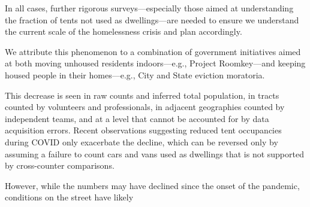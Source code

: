 \documentclass[11pt]{article}
\begin{document}
\indent In all cases, further rigorous surveys---especially those aimed at understanding the fraction of
tents not used as  dwellings---are needed to ensure we understand the current scale of the 
homelessness crisis and plan accordingly.

We attribute this phenomenon to a combination of government initiatives aimed at both moving unhoused
residents indoors---e.g., Project Roomkey---and keeping housed people in their homes---e.g., City and State
eviction moratoria. 


This decrease is seen in raw counts and inferred total
population, in tracts counted by volunteers and professionals, in adjacent geographies counted by independent
teams, and at a level that cannot be accounted for by data acquisition errors. Recent observations suggesting
reduced tent occupancies during COVID only exacerbate the decline, which can be reversed only by assuming
a failure to count cars and vans used as dwellings that is not supported by cross-counter comparisons.




However, while the numbers may have declined since the onset of the pandemic, conditions on the street
have likely 
\end{document}
